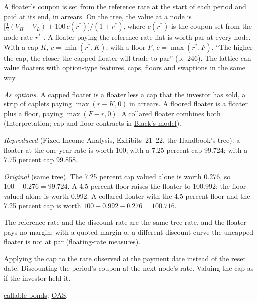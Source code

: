 \begin{qfmethod}\label{meth:capped-floored-floater-valuation}
 A floater's coupon is set from the reference rate at the start of each period and paid at its end, in arrears. On the tree, the value at a node is $\bigl[\tfrac12(V_H+V_L)+100\,c(r^*)\bigr]/(1+r^*)$, where $c(r^*)$ is the coupon set from the node rate $r^*$ \citep[chap.~9, sec.~IX, pp.~244--247]{fixed-income-analysis-2007}. A floater paying the reference rate flat is worth par at every node. With a cap $K$, $c=\min(r^*,K)$; with a floor $F$, $c=\max(r^*,F)$. ``The higher the cap, the closer the capped floater will trade to par'' (p.~246). The lattice can value floaters with option-type features, caps, floors and swaptions in the same way \citep[chap.~36, p.~832]{s7-fabozzifixed}.

\emph{As options.} A capped floater is a floater less a cap that the investor has sold, a strip of caplets paying $\max(r-K,0)$ in arrears. A floored floater is a floater plus a floor, paying $\max(F-r,0)$. A collared floater combines both (Interpretation; cap and floor contracts in \hyperref[meth:black-model-rates-currencies]{Black's model}).

 \emph{Reproduced} (Fixed Income Analysis, Exhibits~21--22, the Handbook's tree): a floater at the one-year rate is worth 100; with a 7.25 percent cap 99.724; with a 7.75 percent cap 99.858.

\emph{Original} (same tree). The 7.25 percent cap valued alone is worth 0.276, so $100-0.276=99.724$. A 4.5 percent floor raises the floater to 100.992; the floor valued alone is worth 0.992. A collared floater with the 4.5 percent floor and the 7.25 percent cap is worth $100+0.992-0.276=100.716$.

 The reference rate and the discount rate are the same tree rate, and the floater pays no margin; with a quoted margin or a different discount curve the uncapped floater is not at par (\hyperref[meth:floating-money-market-yields]{floating-rate measures}).

 Applying the cap to the rate observed at the payment date instead of the reset date. Discounting the period's coupon at the next node's rate. Valuing the cap as if the investor held it.

 \hyperref[meth:callable-putable-bond-valuation]{callable bonds}; \hyperref[meth:option-adjusted-spread]{OAS}.

\end{qfmethod}
